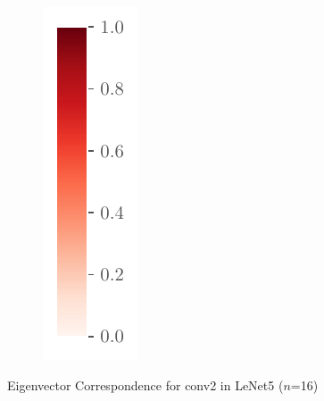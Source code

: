 \begin{figure}[ht]
\begin{subfigure}[t]{0.04\textwidth}
        \includegraphics[width=\textwidth]{Figures/Misc/colorbar.pdf}
    \end{subfigure}
    \caption{Eigenvector Correspondence for conv2 in LeNet5 ($n$=16)}
    \label{fig:Corr_conv}
\end{figure}
